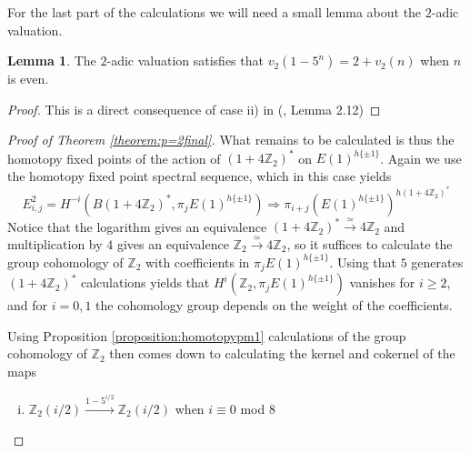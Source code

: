 \documentclass[a4paper]{article} %
\theoremstyle{definition}
\newtheorem{lemma}[theorem]{Lemma}
\newcommand{\toWithMapLong}[1]{\overset{#1}{\longrightarrow}}
\newcommand{\Z}{\mathbb{Z}}
\renewcommand{\implies}{\Rightarrow}    %
\begin{document}
For the last part of the calculations we will need a small lemma about the $2$-adic valuation.

\begin{lemma}\label{lemma:2adicval}
  The $2$-adic valuation satisfies that $v_2(1-5^n) = 2 + v_2(n)$ when $n$ is even.
\end{lemma}
\begin{proof}
This is a direct consequence of case ii) in (\cite{adams}, Lemma 2.12)
\end{proof}

\begin{proof}[Proof of Theorem \ref{theorem:p=2final}]
  What remains to be calculated is thus the homotopy fixed points of the action of $(1 + 4\Z_2)^*$ on $E(1)^{h\{\pm 1\}}$. Again we use the homotopy fixed point spectral sequence, which in this case yields
  \[
  E^2_{i,j} = H^{-i}(B(1+4 \Z_2)^*, \pi_jE(1)^{h\{\pm 1\}}) \implies \pi_{i+j}\left(E(1)^{h\{\pm 1\}}\right)^{h(1 + 4\Z_2)^*}
  \]
  Notice that the logarithm gives an equivalence $(1+4\Z_2)^*\toWithMapLong{\simeq} 4\Z_2$ and multiplication by $4$ gives an equivalence $\Z_2 \toWithMapLong{\simeq} 4\Z_2$, so it suffices to calculate the group cohomology of $\Z_2$ with coefficients in $\pi_jE(1)^{h\{\pm 1\}}$. Using that $5$ generates $(1+4\Z_2)^*$ calculations yields that
  $H^i(\Z_2, \pi_jE(1)^{h\{\pm 1\}})$ vanishes for $i \ge 2$, and for $i =0,1$ the cohomology group depends on the weight of the coefficients.
  \iffalse
  \begin{center}
    \begin{tikzpicture}
    \matrix (m) [matrix of math nodes,
      nodes in empty cells,nodes={minimum width=5ex,
      minimum height=5ex,outer sep=0pt},
      column sep=1ex,row sep=1ex]{
        \cdots & &      &     &     & \\
           \cdots &    &  \Z &  0  & \Z & \\
           \cdots  &   &  \Z  & \Z &  \Z_2(0 )  & \\
      \strut\cdots  &   -2  &  -1  & 0 & \strut \\};
  \draw[thick] (m-1-6.west) -- (m-4-6.west) ;
  \draw[thick] (m-4-1.north) -- (m-4-6.north) ;
  \end{tikzpicture}
  \end{center}
  \fi
   Using Proposition \ref{proposition:homotopypm1} calculations of the group cohomology of $\Z_2$ then comes down to calculating the kernel and cokernel of the maps
  \begin{enumerate}[i)]
    \item $\Z_2(i/2) \toWithMapLong{1-5^{i/2}} \Z_2(i/2)$ when $i \equiv 0$ mod $8$

\end{enumerate}
\end{proof}
\end{document}
